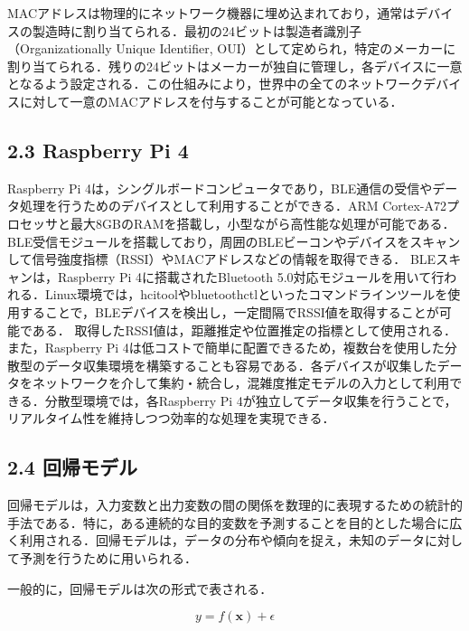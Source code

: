 MACアドレスは物理的にネットワーク機器に埋め込まれており，通常はデバイスの製造時に割り当てられる．最初の24ビットは製造者識別子（Organizationally Unique Identifier, OUI）として定められ，特定のメーカーに割り当てられる．残りの24ビットはメーカーが独自に管理し，各デバイスに一意となるよう設定される．この仕組みにより，世界中の全てのネットワークデバイスに対して一意のMACアドレスを付与することが可能となっている．

\subsection*{2.3 Raspberry Pi 4}
Raspberry Pi 4は，シングルボードコンピュータであり，BLE通信の受信やデータ処理を行うためのデバイスとして利用することができる．ARM Cortex-A72プロセッサと最大8GBのRAMを搭載し，小型ながら高性能な処理が可能である．BLE受信モジュールを搭載しており，周囲のBLEビーコンやデバイスをスキャンして信号強度指標（RSSI）やMACアドレスなどの情報を取得できる．
BLEスキャンは，Raspberry Pi 4に搭載されたBluetooth 5.0対応モジュールを用いて行われる．Linux環境では，hcitoolやbluetoothctlといったコマンドラインツールを使用することで，BLEデバイスを検出し，一定間隔でRSSI値を取得することが可能である．
取得したRSSI値は，距離推定や位置推定の指標として使用される．
また，Raspberry Pi 4は低コストで簡単に配置できるため，複数台を使用した分散型のデータ収集環境を構築することも容易である．各デバイスが収集したデータをネットワークを介して集約・統合し，混雑度推定モデルの入力として利用できる．分散型環境では，各Raspberry Pi 4が独立してデータ収集を行うことで，リアルタイム性を維持しつつ効率的な処理を実現できる．

\subsection*{2.4 回帰モデル}
回帰モデルは，入力変数と出力変数の間の関係を数理的に表現するための統計的手法である．特に，ある連続的な目的変数を予測することを目的とした場合に広く利用される．回帰モデルは，データの分布や傾向を捉え，未知のデータに対して予測を行うために用いられる．

一般的に，回帰モデルは次の形式で表される．

\begin{equation}
	y = f(\mathbf{x}) + \epsilon
\end{equation}

